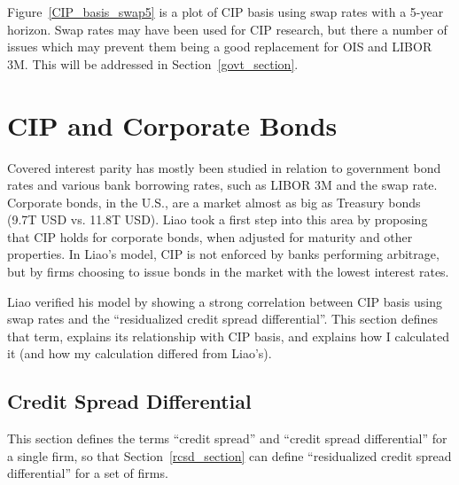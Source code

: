 Figure~\ref{CIP_basis_swap5} is a plot of CIP basis using swap rates with a 5-year horizon.  Swap rates may have been used for CIP research, but there a number of issues which may prevent them being a good replacement for OIS and LIBOR 3M.  This will be addressed in Section~\ref{govt_section}.



 


\chapter{CIP and Corporate Bonds} \label{Liao_chapter}

Covered interest parity has mostly been studied in relation to government bond rates and various bank borrowing rates, such as LIBOR 3M and the swap rate.  Corporate bonds, in the U.S., are a market almost as big as Treasury bonds (9.7T USD vs. 11.8T USD).  Liao\cite{Liao2016} took a first step into this area by proposing that CIP holds for corporate bonds, when adjusted for maturity and other properties.  In Liao's model, CIP is not enforced by banks performing arbitrage, but by firms choosing to issue bonds in the market with the lowest interest rates.

Liao verified his model by showing a strong correlation between CIP basis using swap rates and the ``residualized credit spread differential''.  This section defines that term, explains its relationship with CIP basis, and explains how I calculated it (and how my calculation differed from Liao's).

\section{Credit Spread Differential}

This section defines the terms ``credit spread'' and ``credit spread differential'' for a single firm, so that Section~\ref{rcsd_section} can define ``residualized credit spread differential'' for a set of firms.  

